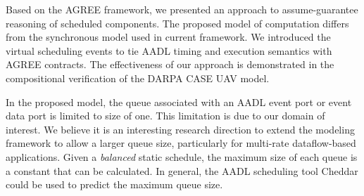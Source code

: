 Based on the AGREE framework, we presented an approach to assume-guarantee reasoning of scheduled components. The proposed model of computation differs from the synchronous model used in current framework. We introduced the virtual scheduling events to tie AADL timing and execution semantics with AGREE contracts. The effectiveness of our approach is demonstrated in the compositional verification of the DARPA CASE UAV model.

In the proposed model, the queue associated with an AADL event port or event data port is limited to size of one. This limitation is due to our domain of interest. We believe it is an interesting research direction to extend the modeling framework to allow a larger queue size, particularly for multi-rate dataflow-based applications. Given a \emph{balanced} static schedule, the maximum size of each queue is a constant that can be calculated. In general, the AADL scheduling tool Cheddar could be used to predict the maximum queue size.
